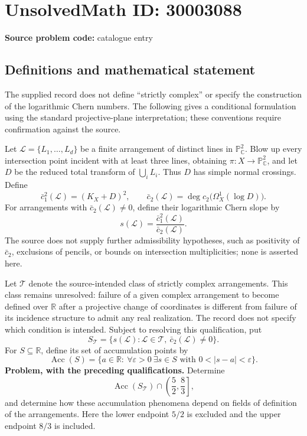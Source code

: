 \documentclass[11pt]{article}
\newcommand{\R}{\mathbb{R}}
\newcommand{\C}{\mathbb{C}}
\newcommand{\PP}{\mathbb{P}}
\begin{document}
\section*{UnsolvedMath ID: 30003088}
\textbf{Source problem code:} catalogue entry
\subsection{Definitions and mathematical statement}
The supplied record does not define ``strictly complex'' or specify the construction of the logarithmic Chern numbers. The following gives a conditional formulation using the standard projective-plane interpretation; these conventions require confirmation against the source.

Let \(\mathcal L=\{L_1,\ldots,L_d\}\) be a finite arrangement of distinct lines in \(\PP^2_{\C}\). Blow up every intersection point incident with at least three lines, obtaining \(\pi:X\to\PP^2_{\C}\), and let \(D\) be the reduced total transform of \(\bigcup_i L_i\). Thus \(D\) has simple normal crossings. Define
\[
\bar c_1^2(\mathcal L)=(K_X+D)^2,
\qquad
\bar c_2(\mathcal L)=\deg c_2\bigl(\Omega_X^1(\log D)\bigr).
\]
For arrangements with \(\bar c_2(\mathcal L)\ne0\), define their logarithmic Chern slope by
\[
s(\mathcal L)=\frac{\bar c_1^2(\mathcal L)}{\bar c_2(\mathcal L)}.
\]
The source does not supply further admissibility hypotheses, such as positivity of \(\bar c_2\), exclusions of pencils, or bounds on intersection multiplicities; none is asserted here.

Let \(\mathscr T\) denote the source-intended class of strictly complex arrangements. This class remains unresolved: failure of a given complex arrangement to become defined over \(\R\) after a projective change of coordinates is different from failure of its incidence structure to admit any real realization. The record does not specify which condition is intended. Subject to resolving this qualification, put
\[
S_{\mathscr T}=\{s(\mathcal L):\mathcal L\in\mathscr T,\ \bar c_2(\mathcal L)\ne0\}.
\]
For \(S\subseteq\R\), define its set of accumulation points by
\[
\operatorname{Acc}(S)=\{a\in\R:\ \forall\varepsilon>0\ \exists s\in S\text{ with }0<|s-a|<\varepsilon\}.
\]
\textbf{Problem, with the preceding qualifications.} Determine
\[
\operatorname{Acc}(S_{\mathscr T})\cap\left(\frac52,\frac83\right],
\]
and determine how these accumulation phenomena depend on fields of definition of the arrangements. Here the lower endpoint \(5/2\) is excluded and the upper endpoint \(8/3\) is included.
\end{document}
